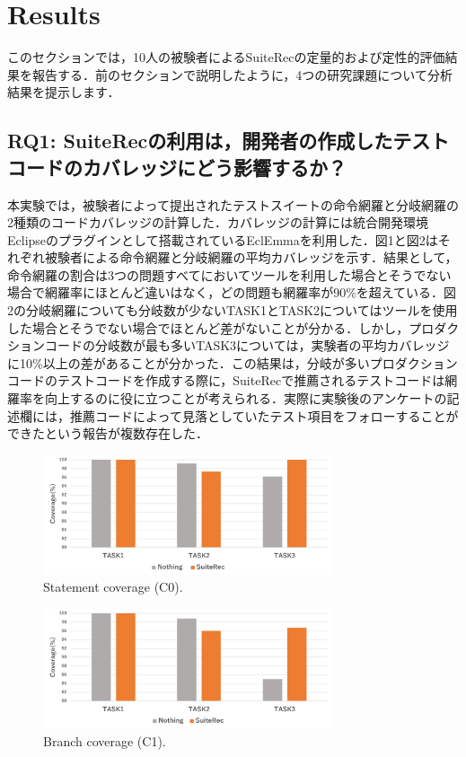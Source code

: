 \documentclass[conference]{IEEEtran}
\begin{document}
\section{Results}

このセクションでは，10人の被験者によるSuiteRecの定量的および定性的評価結果を報告する．前のセクションで説明したように，4つの研究課題について分析結果を提示します．

\subsection{RQ1: SuiteRecの利用は，開発者の作成したテストコードのカバレッジにどう影響するか？}
本実験では，被験者によって提出されたテストスイートの命令網羅と分岐網羅の2種類のコードカバレッジの計算した．カバレッジの計算には統合開発環境Eclipseのプラグインとして搭載されているEclEmmaを利用した．図1と図2はそれぞれ被験者による命令網羅と分岐網羅の平均カバレッジを示す．結果として，命令網羅の割合は3つの問題すべてにおいてツールを利用した場合とそうでない場合で網羅率にほとんど違いはなく，どの問題も網羅率が90\%を超えている．図2の分岐網羅についても分岐数が少ないTASK1とTASK2についてはツールを使用した場合とそうでない場合でほとんど差がないことが分かる．しかし，プロダクションコードの分岐数が最も多いTASK3については，実験者の平均カバレッジに10\%以上の差があることが分かった．この結果は，分岐が多いプロダクションコードのテストコードを作成する際に，SuiteRecで推薦されるテストコードは網羅率を向上するのに役に立つことが考えられる．実際に実験後のアンケートの記述欄には，推薦コードによって見落としていたテスト項目をフォローすることができたという報告が複数存在した．
\begin{figure}[htbp]
\centerline{\includegraphics[width=8.5cm]{C0.pdf}}
\caption{Statement coverage (C0).}
\label{fig}
\end{figure}

\begin{figure}[htbp]
\centerline{\includegraphics[width=8.5cm]{C1.pdf}}
\caption{Branch coverage (C1).}
\label{fig}
\end{figure}
\end{document}
